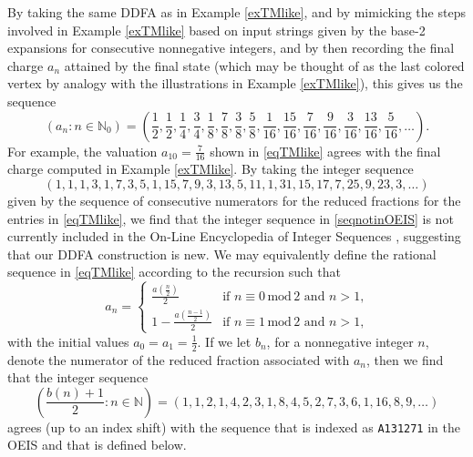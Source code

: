 \documentclass[12pt]{article}
\begin{document}
 By taking the same DDFA as in Example \ref{exTMlike}, and by mimicking the steps involved in Example \ref{exTMlike} based on input 
 strings given by the base-2 expansions for consecutive nonnegative integers, and by then recording the final charge $a_{n}$ attained by 
 the final state (which may be thought of as the last colored vertex by analogy with the illustrations in Example \ref{exTMlike}), this 
 gives us the sequence 
\begin{equation}\label{eqTMlike}
 (a_{n} : n \in \mathbb{N}_{0}) = \left( \frac{1}{2},\frac{1}{2},\frac{1}{4},\frac{3}{4}, \frac{1}{8}, \frac{7}{8}, 
 \frac{3}{8},\frac{5}{8},\frac{1}{16},\frac{15}{16},\frac{7}{16}, 
 \frac{9}{16},\frac{3}{16},\frac{13}{16},\frac{5}{16}, \ldots \right). 
\end{equation}
 For example, the valuation $a_{10} = \frac{7}{16}$ shown in \eqref{eqTMlike} 
 agrees with the final charge computed in Example \ref{exTMlike}. 
 By taking the integer sequence 
\begin{equation}\label{seqnotinOEIS}
 (1, 1, 1, 3, 1, 7, 3, 5, 1, 15, 7, 9, 3, 13, 5, 11, 1, 31, 15, 17, 7, 25, 9, 23, 3, \ldots)
\end{equation}
 given by the sequence of consecutive numerators for the reduced fractions for the entries in \eqref{eqTMlike}, we find that the 
 integer sequence in \eqref{seqnotinOEIS} is not currently included in the {O}n-{L}ine {E}ncyclopedia of {I}nteger {S}equences 
 \cite{Sloane2025}, suggesting that our DDFA construction is new. We may equivalently define the rational sequence in 
 \eqref{eqTMlike} according to the recursion such that 
\begin{equation}\label{ancases}
 a_{n} = \begin{cases} 
 \frac{a\left( \frac{n}{2} \right)}{2} & \text{if $n \equiv 0 \, \text{mod} \, 2$ and $n > 1$,} \\ 
 1 - \frac{a\left( \frac{n-1}{2} \right)}{2} & \text{if $n \equiv 1 \, \text{mod} \, 2$ and $n > 1$,} 
 \end{cases} 
\end{equation}
 with the initial values $a_{0} = a_{1} = \frac{1}{2}$. If we let $b_{n}$, for a nonnegative integer $n$, 
 denote the numerator of the reduced fraction associated with $a_{n}$, then 
 we find that the integer sequence 
\begin{equation}\label{modifybn}
 \left( \frac{b(n) + 1}{2} : n \in \mathbb{N} \right) 
 = (1, 1, 2, 1, 4, 2, 3, 1, 8, 4, 5, 2, 7, 3, 6, 1, 16, 8, 9, \ldots) 
\end{equation}
 agrees (up to an index shift) with the sequence that is indexed as {\tt A131271} 
 in the OEIS and that is defined below. 
\end{document}
